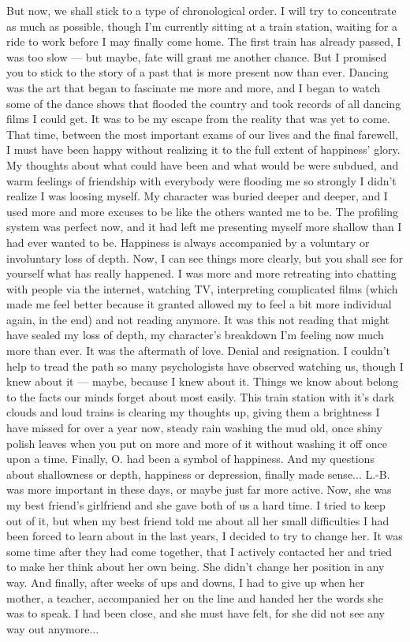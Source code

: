 But now, we shall stick to a type of chronological order. I will try to concentrate as much as possible, though I'm currently sitting at a train station, waiting for a ride to work before I may finally come home. The first train has already passed, I was too slow --- but maybe, fate will grant me another chance. 
But I promised you to stick to the story of a past that is more present now than ever. Dancing was the art that began to fascinate me more and more, and I began to watch some of the dance shows that flooded the country and took records of all dancing films I could get. It was to be my escape from the reality that was yet to come. 
That time, between the most important exams of our lives and the final farewell, I must have been happy without realizing it to the full extent of happiness' glory. My thoughts about what could have been and what would be were subdued, and warm feelings of friendship with everybody were flooding me so strongly I didn't realize I was loosing myself. My character was buried deeper and deeper, and I used more and more excuses to be like the others wanted me to be. The profiling system was perfect now, and it had left me presenting myself more shallow than I had ever wanted to be. 
Happiness is always accompanied by a voluntary or involuntary loss of depth. 
Now, I can see things more clearly, but you shall see for yourself what has really happened. 
I was more and more retreating into chatting with people via the internet, watching TV, interpreting complicated films (which made me feel better because it granted allowed my to feel a bit more individual again, in the end) and not reading anymore. 
It was this not reading that might have sealed my loss of depth, my character's breakdown I'm feeling now much more than ever. 
It was the aftermath of love. Denial and resignation. I couldn't help to tread the path so many psychologists have observed watching us, though I knew about it --- maybe, because I knew about it. Things we know about belong to the facts our minds forget about most easily. 
This train station with it's dark clouds and loud trains is clearing my thoughts up, giving them a brightness I have missed for over a year now, steady rain washing the mud old, once shiny polish leaves when you put on more and more of it without washing it off once upon a time. 
Finally, O. had been a symbol of happiness. And my questions about shallowness or depth, happiness or depression, finally made sense... 
L.-B. was more important in these days, or maybe just far more active. Now, she was my best friend's girlfriend and she gave both of us a hard time. I tried to keep out of it, but when my best friend told me about all her small difficulties I had been forced to learn about in the last years, I decided to try to change her. It was some time after they had come together, that I actively contacted her and tried to make her think about her own being. She didn't change her position in any way. And finally, after weeks of ups and downs, I had to give up when her mother, a teacher, accompanied her on the line and handed her the words she was to speak. I had been close, and she must have felt, for she did not see any way out anymore... 
